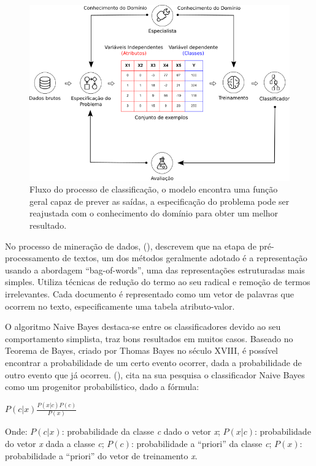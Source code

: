 \begin{figure}[H]
\begin{center}
    \includegraphics[scale=0.60]{images/processo_classificacao.png}
\end{center}
\caption{Fluxo do processo de classificação, o modelo encontra uma função geral 
capaz de prever as saídas, a especificação do problema pode ser reajustada com 
o conhecimento do domínio para obter um melhor resultado.}
\label{figure:processo_classificacao}
\end{figure}

No processo de mineração de dados,  
(\citeyear{matsubara2003pretext}), descrevem que na etapa de pré-processamento 
de textos, um dos métodos geralmente adotado é a representação usando a 
abordagem ``bag-of-words'', uma das representações estruturadas mais simples. 
Utiliza técnicas de redução do termo ao seu radical e remoção de termos 
irrelevantes. Cada documento é representado como um vetor de palavras que 
ocorrem no texto, especificamente uma tabela atributo-valor. 

O algoritmo Naive Bayes destaca-se entre os classificadores devido ao seu 
comportamento simplista, traz bons resultados em muitos casos. Baseado no 
Teorema de Bayes, criado por Thomas Bayes no século XVIII, é possível encontrar 
a probabilidade de um certo evento ocorrer, dada a probabilidade de outro 
evento que já ocorreu.  
(\citeyear{de2017mineraccao}), cita na sua pesquisa o classificador Naive Bayes 
como um progenitor probabilístico, dado a fórmula:
\begin{center}
\( \textit{P}(c|x)\frac{\textit{P}(x|c)\textit{P}(c)}{\textit{P}(x)} \)
\end{center}
Onde: \(\textit{P}(c|x)\): probabilidade da classe \textit{c} dado o vetor 
\textit{x}; \(\textit{P}(x|c)\): probabilidade do vetor \textit{x} dada a 
classe \textit{c}; \(\textit{P}(c)\): probabilidade a ``priori'' da classe 
\textit{c}; \(\textit{P}(x)\): probabilidade a ``priori'' do vetor de 
treinamento \textit{x}.

